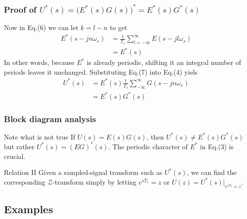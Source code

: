 \begin{frame}
	\frametitle{Proof of $U^{*}(s) = \big(E^{*}(s)G(s)\big)^{*} = E^{*}(s)G^{*}(s)$}
	Now in Eq.(6) we can let $k = l - n$ to get
	\begin{equation}
	\begin{split}
	E^{*}(s-jn\omega_s) &= \frac{1}{T_s} \sum_{l=-\infty}^{\infty} E(s - jl\omega_s)\\
	&= E^{*}(s)
	\end{split}
	\end{equation}
	\justify
	In other words, because $E^{*}$ is already periodic, shifting it an integral number of periods leaves it unchanged. Substituting Eq.(7) into Eq.(4) yiels
	\begin{equation}
	\begin{split}
	U^{*}(s) &= E^{*}(s) \frac{1}{T_s} \sum_{-\infty}^{\infty} G(s - jn\omega_s)\\
	&= E^{*}(s)G^{*}(s)
	\end{split}
	\end{equation}
\end{frame}

\begin{frame}
	\frametitle{Block diagram analysis}
	\begin{alertblock}{Note what is not true}
		\justify
		If $U(s) = E(s)G(s)$, then $U^{*}(s) \neq E^{*}(s) G^{*}(s)$ but rather $U^{*}(s) = (EG)^{*}(s)$. The periodic character of $E^{*}$ in Eq.(3) is crucial.
	\end{alertblock}
	\vspace{1em}
	\begin{block}{Relation II}
		\justify
		Given a sampled-signal transform such as $U^{*}(s)$, we can find the corresponding $\mathcal{Z}$-transform simply by letting $e^{sT_s} = z$ or $U(z) = U^{*}(s)|_{e^{sT_s} = z}$.
	\end{block}
\end{frame}

\subsection{Examples}

